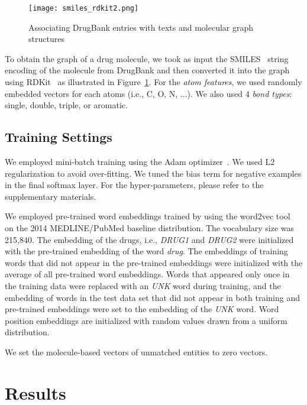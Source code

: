 \documentclass[11pt,a4paper]{article}
\begin{document}
\begin{figure}[t]
  \centering
  \texttt{[image: smiles\_rdkit2.png]}
  \caption{Associating DrugBank entries with texts and molecular graph structures}
  \label{figure:smiles}
\end{figure} 

To obtain the graph of a drug molecule, we took as input the SMILES~\cite{weininger1988smiles} string encoding of the molecule from DrugBank and then converted it into the graph using RDKit~\cite{landrum2016rdkit} as illustrated in Figure~\ref{figure:smiles}.
For the \textit{atom features}, we used randomly embedded vectors for each atoms (i.e., C, O, N, ...). We also used 4 \textit{bond types}: single, double, triple, or aromatic.

\subsection{Training Settings}

We employed mini-batch training using the Adam optimizer~\cite{kingma2014adam}. We used L2 regularization to avoid over-fitting. We tuned the bias term  for negative examples in the final softmax layer. 
For the hyper-parameters, please refer to the supplementary materials. 

We employed pre-trained word embeddings trained by using the word2vec tool~\cite{mikolov2013distributed} on the 2014 MEDLINE/PubMed baseline distribution. The vocabulary size was 215,840.
The embedding of the drugs, i.e., \textsl{DRUG1} and \textsl{DRUG2} were initialized with the pre-trained embedding of the word \textsl{drug}.
The embeddings of training words that did not appear in the pre-trained embeddings were initialized with the average of all pre-trained word embeddings. Words that appeared only once in the training data were replaced with an \textsl{UNK} word during training, and the embedding of words in the test data set that did not appear in both training and pre-trained embeddings were set to the embedding of the \textsl{UNK} word. Word position embeddings are initialized with random values drawn from a uniform distribution.

We set the molecule-based vectors of unmatched entities to zero vectors. 

\section{Results}
\end{document}
